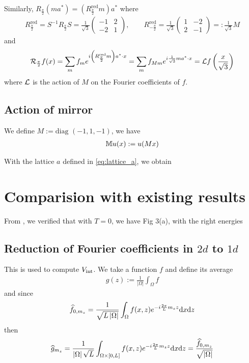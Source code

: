\documentclass[11pt,a4paper,reqno,french,tikz]{amsart}
\def\d{{\rm d}}
\newcommand{\pa}[1]{\left( #1 \right)} %
\newcommand{\ab}[1]{\left|#1\right|} %
\newcommand{\f}[2]{\frac{#1}{#2}} %
\newcommand{\ind}[1]{_{\textup{#1}}} %
\newcommand{\mat}[1]{\begin{pmatrix} #1 \end{pmatrix}} %
\begin{document}
Similarly, $R_{\f{\pi}2}  \pa{ma^* } = \pa{R_{\f{\pi}2}^{\text{red}} m} a^*$ where
\begin{align*}
	R_{\f{\pi}2} ^{\text{red}} = S^{-1} R_{\f{\pi}2}  S = \f{1}{\sqrt 3} \mat{-1 & 2 \\ -2 & 1}, \qquad R_{-\f{\pi}2}^{\text{red}} = \f{1}{\sqrt 3} \mat{1 & -2 \\ 2 & -1} =: \f{1}{\sqrt 3} M
\end{align*}
and
\begin{align*}
\cR_{\f{\pi}2} f(x) = \sum_m f_m e^{i \pa{R_{\f{\pi}2}^{\text{red}} m} a^* \cdot x} = \sum_m f_{M m} e^{i \f{1}{\sqrt 3} m a^* \cdot x} = \cL f\pa{\f{x}{\sqrt 3}}
\end{align*}
where $\mathcal{L}$ is the action of $M$ on the Fourier coefficients of $f$.

\subsection{Action of mirror}%
\label{sub:action_of_mirror}

We define $M := \text{diag } \pa{-1,1,-1}$, we have
\begin{align*}
\mathbb{M} u(x) := u(M x)
\end{align*}

With the lattice $a$ defined in \eqref{eq:lattice_a}, we obtain

\section{Comparision with existing results}%
\label{sec:comparision_with_existing_results}

From \cite{FanCarZhu19}, we verified that with $T=0$, we have Fig 3(a), with the right energies

\subsection{Reduction of Fourier coefficients in $2d$ to $1d$}%
\label{sub:reduction_of_fourier_coefficients_in_2d_to_1d_}

This is used to compute $V\ind{int}$. We take a function $f$ and define its average
\begin{align*}
g(z) := \f{1}{\ab{\Omega}} \int_\Omega f
\end{align*}
and since
\begin{align*}
\widehat{f}_{0,m_z} = \f{1}{\sqrt{L \ab{\Omega}}} \int_\Omega f(x,z) e^{-i\f{2\pi}{L} m_z z} \d x \d z
\end{align*}
then
\begin{align*}
\widehat{g}_{m_z} = \f{1}{\ab{\Omega} \sqrt{L}} \int_{\Omega \times [0,L]} f(x,z) e^{-i\f{2\pi}{L} m_z z} \d x \d z = \f{\widehat{f}_{0,m_z}}{\sqrt{\ab{\Omega}}}
\end{align*}
\end{document}
